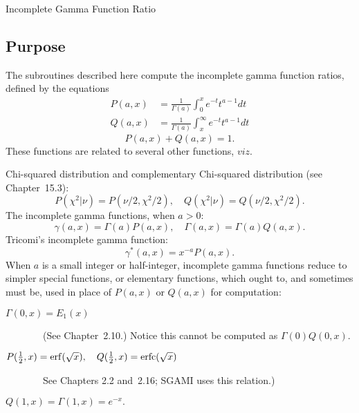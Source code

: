 \documentclass[twoside]{MATH77}
\begin{document}
 Incomplete Gamma Function Ratio


\subsection{Purpose}

The subroutines described here compute the incomplete gamma function ratios,
defined by the equations%
\begin{align*}
P(a,x)&=\frac 1{\Gamma (a)}\int_0^x e^{-t}t^{a-1}dt\\
Q(a,x)&=\frac 1{\Gamma (a)}\int_x^\infty e^{-t}t^{a-1}dt
\end{align*}
\begin{equation*}
P(a,x)+Q(a,x)=1.
\end{equation*}
These functions are related to several other functions, $viz.$

Chi-squared distribution and complementary Chi-squared distribution
(see Chapter~15.3):
\begin{equation*}
P(\chi ^2|\nu )=P(\nu /2,\chi ^2/2),\quad Q(\chi ^2|\nu )=Q(\nu /2,\chi ^2/2).
\end{equation*}
The incomplete gamma functions, when $a>0$:
\begin{equation*}
\gamma (a,x)=\Gamma (a)P(a,x),\quad \Gamma (a,x)=\Gamma (a)Q(a,x).
\end{equation*}
Tricomi's incomplete gamma function:
\begin{equation*}
\gamma ^*(a,x)=x^{-a}P(a,x).
\end{equation*}
When $a$ is a small integer or half-integer, incomplete gamma
functions reduce to simpler special functions, or elementary
functions, which ought to, and sometimes must be, used in place of
$P(a,x)$ or $Q(a,x)$ for computation:

\begin{description}
\item[$\Gamma (0,x) = E_1(x)$] \ \ (See Chapter~2.10.)  Notice this
cannot be computed as $\Gamma (0) Q(0,x)$.

\item[$P(\frac 12,x) = \erf (\sqrt x),\quad Q(\frac 12,x) = \erfc (\sqrt x)$]%
 \ \ See Chapters 2.2 and~2.16; SGAMI uses this relation.)

\item[$Q(1,x) = \Gamma (1,x) = e^{-x}.$] \
\end{description}
\end{document}
